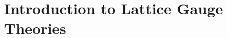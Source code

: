 \chapter{Introduction to Lattice Gauge Theories}
\label{chap:introduction_to_lattice_gauge_theories}




